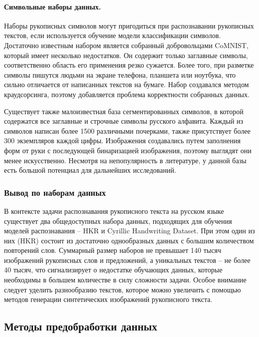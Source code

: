 \paragraph{Символьные наборы данных.}{Наборы рукописных символов могут пригодиться при распознавании рукописных текстов, если используется обучение модели классификации символов.
Достаточно известным набором является собранный добровольцами CoMNIST, который имеет несколько недостатков.
Он содержит только заглавные символы, соответственно область его применения резко сужается.
Более того, при разметке символы пишутся людьми на экране телефона, планшета или ноутбука, что сильно отличается от написанных текстов на бумаге.
Набор создавался методом краудсорсинга, поэтому добавляется проблема корректности собранных данных.

Существует также малоизвестная база сегментированных символов, в которой содержатся все заглавные и строчные символы русского алфавита.
Каждый из символов написан более 1500 различными почерками, также присутствует более 300 экземпляров каждой цифры.
Изображения создавались путем заполнения форм от руки с последующей бинаризацией изображения, поэтому выглядят они менее искусственно.
Несмотря на непопулярность в литературе, у данной базы есть большой потенциал для дальнейших исследований.}

\subsubsection{Вывод по наборам данных}
\label{subsubsec:datasets_conclusion}

В контексте задачи распознавания рукописного текста на русском языке существует два общедоступных набора данных,
подходящих для обучения моделей распознавания -- HKR и Cyrillic Handwriting Dataset.
При этом один из них (HKR) состоит из достаточно однообразных данных с большим количеством повторений слов.
Суммарный размер наборов не превышает 140 тысяч изображений рукописных слов и предложений, а уникальных текстов -- не более 40 тысяч,
что сигнализирует о недостатке обучающих данных, которые необходимы в большем количестве в силу сложности задачи.
Особое внимание следует уделить разнообразию текстов, которое можно увеличить с помощью методов генерации синтетических изображений рукописного текста.

\subsection{Методы предобработки данных}
\label{subsec:preprocessing}

